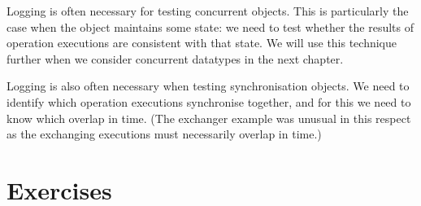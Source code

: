 Logging is often necessary for testing concurrent objects.  This is
particularly the case when the object maintains some state: we need to test
whether the results of operation executions are consistent with that state.
We will use this technique further when we consider concurrent datatypes in
the next chapter.

Logging is also often necessary when testing synchronisation objects.  We need
to identify which operation executions synchronise together, and for this we
need to know which overlap in time.  (The exchanger example was unusual in
this respect as the exchanging executions must necessarily overlap in time.)
 



\section*{Exercises}











